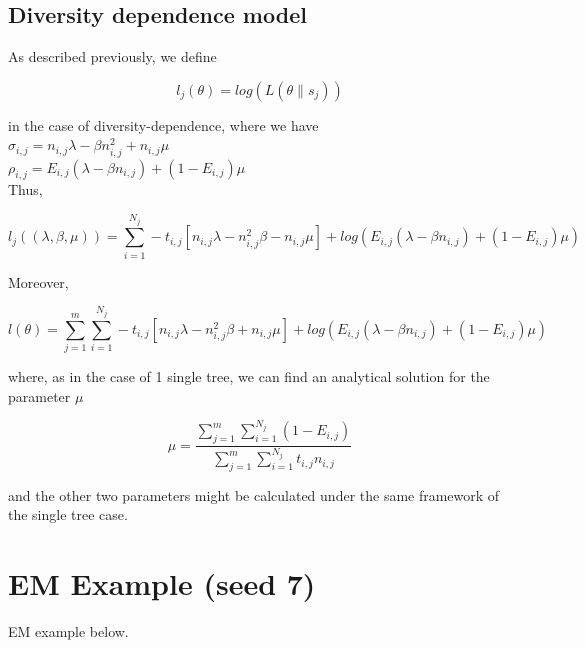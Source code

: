 \documentclass[10pt,a4paper]{article}
\begin{document}
\subsection{Diversity dependence model}

 
As described previously, we define 

$$ l_j(\theta) = log(L(\theta \| s_j)) $$

in the case of diversity-dependence, where we have \\

$\sigma_{i,j} = n_{i,j}\lambda -\beta n_{i,j}^2+n_{i,j}\mu$ \\
$\rho_{i,j} = E_{i,j}(\lambda-\beta n_{i,j})+(1-E_{i,j})\mu$ \\

Thus,

$$ l_j((\lambda,\beta,\mu)) = \displaystyle\sum_{i=1}^{N_j} -t_{i,j}[n_{i,j}\lambda-n_{i,j}^2 \beta - n_{i,j}\mu]+log(E_{i,j}(\lambda-\beta n_{i,j})+(1-E_{i,j})\mu)$$

Moreover, 

$$ l(\theta) = \displaystyle\sum_{j=1}^m \displaystyle\sum_{i=1}^{N_j} -t_{i,j}[n_{i,j}\lambda -n_{i,j}^2 \beta + n_{i,j} \mu] + log(E_{i,j}(\lambda-\beta n_{i,j})+(1-E_{i,j})\mu) $$ 

where, as in the case of 1 single tree, we can find an analytical solution for the parameter $\mu$

$$ \mu = \frac{\displaystyle\sum_{j=1}^m \displaystyle\sum_{i=1}^{N_j}(1-E_{i,j})}{\displaystyle\sum_{j=1}^m \displaystyle\sum_{i=1}^{N_j} t_{i,j}n_{i,j}} $$

and the other two parameters might be calculated under the same framework of the single tree case. 



\section{EM Example (seed 7)}

EM example below. 
\end{document}
